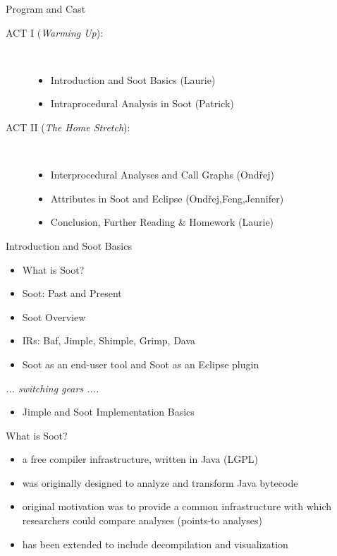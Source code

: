 \begin{slide}{Program and Cast}
\begin{description}
\item[ACT I ({\em Warming Up}):] \hspace{1in} \\
\begin{itemize}
\item Introduction and Soot Basics {\blue (Laurie)}
\item Intraprocedural Analysis in Soot {\blue (Patrick)}
\end{itemize}
\item[ACT II ({\em The Home Stretch}):] \hspace{1in} \\
\begin{itemize}
\item Interprocedural Analyses and Call Graphs {\blue (Ond\v{r}ej)}
\item Attributes in Soot and Eclipse {\blue (Ond\v{r}ej,Feng,Jennifer)}
\item Conclusion, Further Reading \& Homework {\blue (Laurie)}
\end{itemize}
\end{description}
\end{slide}

\begin{slide}{Introduction and Soot Basics}
\begin{itemize}
\item What is Soot?
\item Soot: Past and Present
\item Soot Overview
\item IRs: Baf, {\red Jimple}, Shimple, Grimp, Dava
\item Soot as an end-user tool and Soot as an Eclipse plugin
\end{itemize}
\begin{center}
\textit{ ... switching gears .... }
\end{center}
\begin{itemize}
\item Jimple and Soot Implementation Basics 
\end{itemize}
\end{slide}

\begin{slide}{What is Soot?}
\begin{itemize}
\item a free compiler infrastructure, written in Java (LGPL)
\item was originally designed to analyze and transform Java bytecode
\item original motivation was to provide a common infrastructure with
which researchers could compare analyses (points-to analyses)
\item has been extended to include decompilation and visualization
\end{itemize}
\end{slide}

